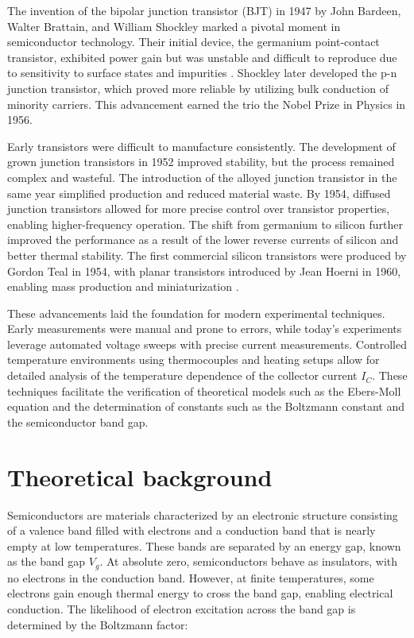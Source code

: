 \documentclass[12pt,letterpaper,twocolumn]{article}
\begin{document}
The invention of the bipolar junction transistor (BJT) in 1947 by John Bardeen, Walter Brattain, and William Shockley marked a pivotal moment in semiconductor technology. Their initial device, the germanium point-contact transistor, exhibited power gain but was unstable and difficult to reproduce due to sensitivity to surface states and impurities \cite{Lukasiak}. Shockley later developed the p-n junction transistor, which proved more reliable by utilizing bulk conduction of minority carriers. This advancement earned the trio the Nobel Prize in Physics in 1956.

Early transistors were difficult to manufacture consistently. The development of grown junction transistors in 1952 improved stability, but the process remained complex and wasteful. The introduction of the alloyed junction transistor in the same year simplified production and reduced material waste. By 1954, diffused junction transistors allowed for more precise control over transistor properties, enabling higher-frequency operation. The shift from germanium to silicon further improved the performance as a result of the lower reverse currents of silicon and better thermal stability. The first commercial silicon transistors were produced by Gordon Teal in 1954, with planar transistors introduced by Jean Hoerni in 1960, enabling mass production and miniaturization \cite{Lukasiak}.

These advancements laid the foundation for modern experimental techniques. Early measurements were manual and prone to errors, while today's experiments leverage automated voltage sweeps with precise current measurements. Controlled temperature environments using thermocouples and heating setups allow for detailed analysis of the temperature dependence of the collector current \( I_C \). These techniques facilitate the verification of theoretical models such as the Ebers-Moll equation and the determination of constants such as the Boltzmann constant and the semiconductor band gap.



\section{Theoretical background}

Semiconductors are materials characterized by an electronic structure consisting of a valence band filled with electrons and a conduction band that is nearly empty at low temperatures. These bands are separated by an energy gap, known as the band gap \( V_g \). At absolute zero, semiconductors behave as insulators, with no electrons in the conduction band. However, at finite temperatures, some electrons gain enough thermal energy to cross the band gap, enabling electrical conduction. The likelihood of electron excitation across the band gap is determined by the Boltzmann factor:
\end{document}
